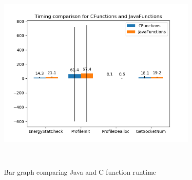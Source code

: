 \begin{figure}[H]
	\centering
	\includegraphics[width=10cm,height=10cm,keepaspectratio]{RuntimeResults_SystemA/CFunctions-JavaFunctions-bar_graph.png}
	\caption{Bar graph comparing Java and C function runtime}
	\label{fig:bar-graph||SystemA}
\end{figure}

